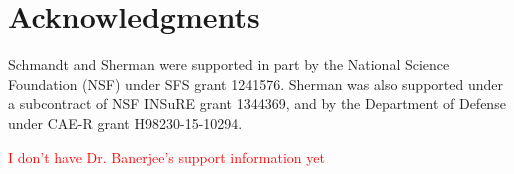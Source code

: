 \section{Acknowledgments}


Schmandt and Sherman were supported in part by the 
National Science Foundation (NSF) under SFS grant 1241576. 
Sherman was also supported under a subcontract of NSF INSuRE grant 1344369, 
and by the Department of Defense under CAE-R grant H98230-15-10294.

\textcolor{red}{I don't have Dr. Banerjee's support information yet}
